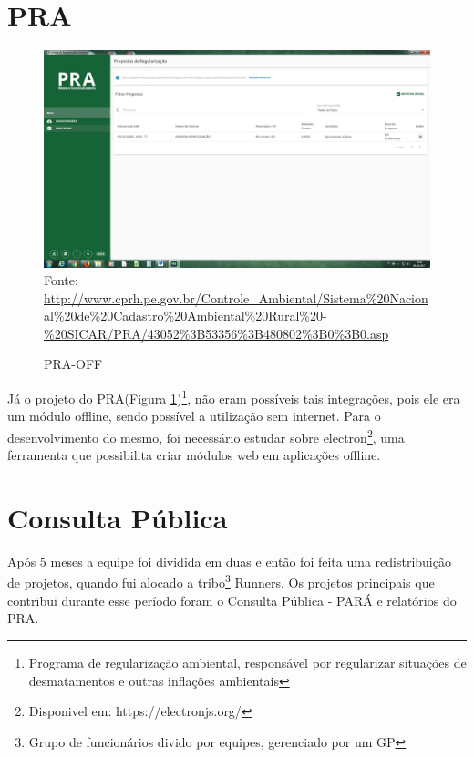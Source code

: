 \section{PRA}
\begin{figure}[H]
\centering
\caption{PRA-OFF} %
\includegraphics[scale=0.5]{pra-off}\\  %
{\small Fonte: \url{http://www.cprh.pe.gov.br/Controle_Ambiental/Sistema%20Nacional%20de%20Cadastro%20Ambiental%20Rural%20-%20SICAR/PRA/43052%3B53356%3B480802%3B0%3B0.asp}} %
\label{fig:pra} %
\end{figure}

Já o projeto do PRA(Figura \ref{fig:pra})\footnote{Programa de regularização ambiental, responsável por regularizar situações de desmatamentos e outras inflações ambientais}, não eram possíveis tais integrações, pois ele era um módulo offline, sendo possível a utilização sem internet. Para o desenvolvimento do mesmo, foi necessário estudar sobre electron\footnote{Disponivel em: https://electronjs.org/}, uma ferramenta que possibilita criar módulos web em aplicações offline.

\section{Consulta Pública}
Após 5 meses a equipe foi dividida em duas e então foi feita uma redistribuição de projetos, quando fui alocado a tribo\footnote{Grupo de funcionários divido por equipes, gerenciado por um GP} Runners. Os projetos principais que contribui durante esse período foram o Consulta Pública - PARÁ e relatórios do PRA.

